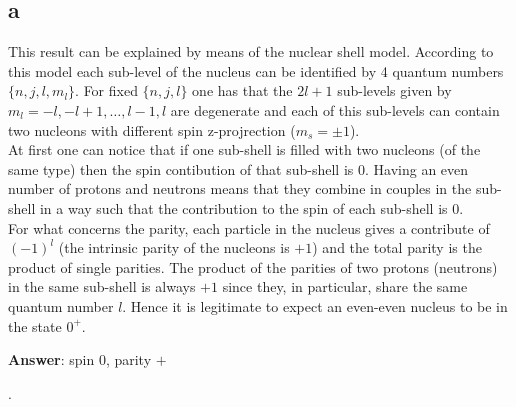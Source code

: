 \subsection*{a}
This result can be explained by means of the nuclear shell model. According to this model each sub-level of the nucleus can be identified by 4 quantum numbers $\{n, j, l, m_l\}$. For fixed $\{n, j, l\}$ 
one has that the $2l+1$ sub-levels given by $m_l = -l, -l+1, \dots, l-1, l$ are degenerate and each of this sub-levels can contain two nucleons with different spin z-projrection ($m_s = \pm 1$). \\
At first one can notice that if one sub-shell is filled with two nucleons (of the same type) then the spin contibution of that sub-shell is 0. Having an even number of protons and neutrons means that 
they combine in couples in the sub-shell in a way such that the contribution to the spin of each sub-shell is 0. \\
For what concerns the parity, each particle in the nucleus gives a contribute of $(-1)^l$ (the intrinsic parity of the nucleons is $+1$) and the total parity is the product of single parities. 
The product of the parities of two protons (neutrons) in the same sub-shell is always $+1$ since they, in particular, share the same quantum number $l$. Hence it is legitimate to expect an even-even nucleus
to be in the state $0^+$.
\vspace{10pt} \\
\centerline{\textbf{Answer}: spin $0$, parity $+$}.